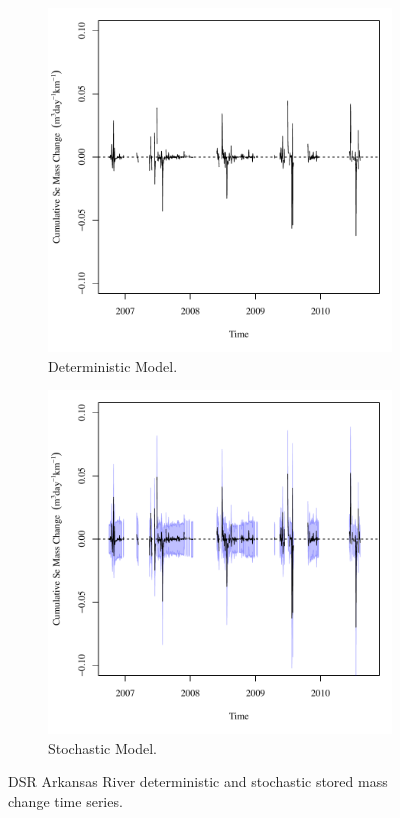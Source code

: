 \begin{linenumbers}
\begin{figure}[htbp]
\centering
	\begin{subfigure}{0.5\textwidth}
		\centering
		\includegraphics[width=0.9\linewidth]{"Figures/Results_DDSR/Balance Mass - Storage"}
		\caption{Deterministic Model.}
		\label{sub:DSRMassStoreD}
	\end{subfigure}%
	\begin{subfigure}{0.5\textwidth}
		\centering
		\includegraphics[width=0.9\linewidth]{"Figures/Results_DSR/Balance Mass - Storage"}
		\caption{Stochastic Model.}
		\label{sub:DSRMassStoreS}
	\end{subfigure}
		\caption[DSR Arkansas River deterministic and stochastic stored mass change time series.]{DSR Arkansas River deterministic and stochastic stored mass change time series.}
	\label{fig:DSRMassStore}
\end{figure}


\end{linenumbers}
